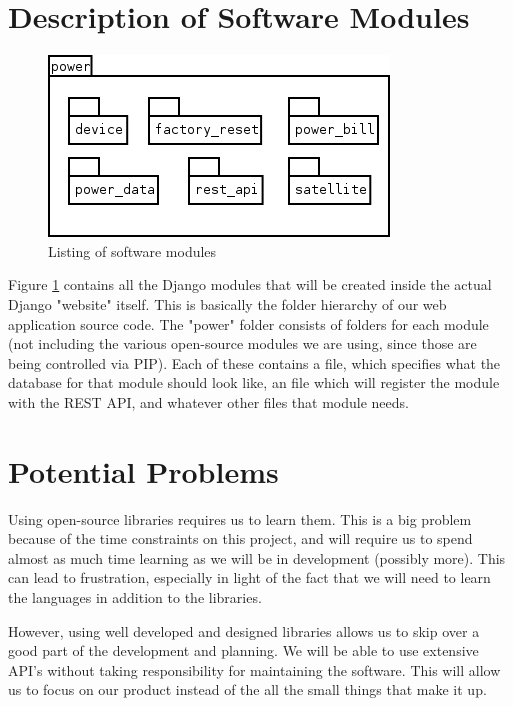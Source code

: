 \section{Description of Software Modules}

\begin{figure}[H]
\centering
\includegraphics[scale=0.75]{Software/images/Power-Package-Listing.png}
\caption{Listing of software modules}
\label{img:S_PackageListing}
\end{figure}

Figure \ref{img:S_PackageListing} contains all the Django modules that will be created inside the actual Django "website" itself.
This is basically the folder hierarchy of our web application source code.
The "power" folder consists of folders for each module (not including the various open-source modules we are using, since those are being controlled via PIP).
Each of these contains a  file, which specifies what the database for that module should look like, an  file which will register the module with the REST API, and whatever other files that module needs.


\section{Potential Problems}

Using open-source libraries requires us to learn them.
This is a big problem because of the time constraints on this project, and will require us to spend almost as much time learning as we will be in development (possibly more).
This can lead to frustration, especially in light of the fact that we will need to learn the languages in addition to the libraries.

However, using well developed and designed libraries allows us to skip over a good part of the development and planning.
We will be able to use extensive API's without taking responsibility for maintaining the software.
This will allow us to focus on our product instead of the all the small things that make it up.


